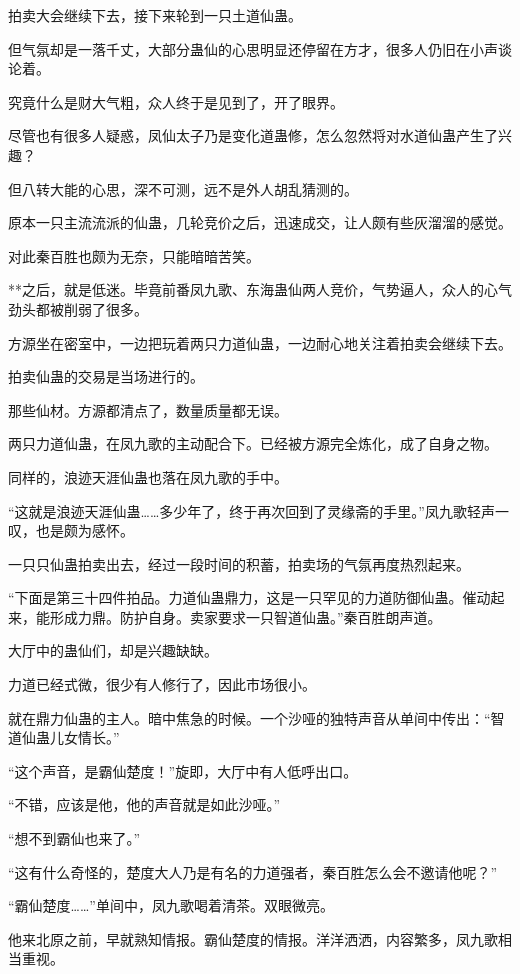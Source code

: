 \begin{this_body}
拍卖大会继续下去，接下来轮到一只土道仙蛊。

但气氛却是一落千丈，大部分蛊仙的心思明显还停留在方才，很多人仍旧在小声谈论着。

究竟什么是财大气粗，众人终于是见到了，开了眼界。

尽管也有很多人疑惑，凤仙太子乃是变化道蛊修，怎么忽然将对水道仙蛊产生了兴趣？

但八转大能的心思，深不可测，远不是外人胡乱猜测的。

原本一只主流流派的仙蛊，几轮竞价之后，迅速成交，让人颇有些灰溜溜的感觉。

对此秦百胜也颇为无奈，只能暗暗苦笑。

**之后，就是低迷。毕竟前番凤九歌、东海蛊仙两人竞价，气势逼人，众人的心气劲头都被削弱了很多。

方源坐在密室中，一边把玩着两只力道仙蛊，一边耐心地关注着拍卖会继续下去。

拍卖仙蛊的交易是当场进行的。

那些仙材。方源都清点了，数量质量都无误。

两只力道仙蛊，在凤九歌的主动配合下。已经被方源完全炼化，成了自身之物。

同样的，浪迹天涯仙蛊也落在凤九歌的手中。

“这就是浪迹天涯仙蛊……多少年了，终于再次回到了灵缘斋的手里。”凤九歌轻声一叹，也是颇为感怀。

一只只仙蛊拍卖出去，经过一段时间的积蓄，拍卖场的气氛再度热烈起来。

“下面是第三十四件拍品。力道仙蛊鼎力，这是一只罕见的力道防御仙蛊。催动起来，能形成力鼎。防护自身。卖家要求一只智道仙蛊。”秦百胜朗声道。

大厅中的蛊仙们，却是兴趣缺缺。

力道已经式微，很少有人修行了，因此市场很小。

就在鼎力仙蛊的主人。暗中焦急的时候。一个沙哑的独特声音从单间中传出：“智道仙蛊儿女情长。”

“这个声音，是霸仙楚度！”旋即，大厅中有人低呼出口。

“不错，应该是他，他的声音就是如此沙哑。”

“想不到霸仙也来了。”

“这有什么奇怪的，楚度大人乃是有名的力道强者，秦百胜怎么会不邀请他呢？”

“霸仙楚度……”单间中，凤九歌喝着清茶。双眼微亮。

他来北原之前，早就熟知情报。霸仙楚度的情报。洋洋洒洒，内容繁多，凤九歌相当重视。


\end{this_body}
